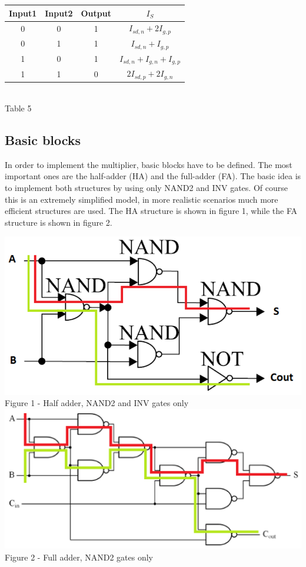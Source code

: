 \documentclass[11pt]{article} %
\begin{document}
\begin{center}
\begin{tabular}{|c|c|c|c|}
	\hline 
            Input1 & Input2 & Output & $I_{S}$\\
	\hline          
	0 & 0 & 1 & $I_{sd,n} + 2I_{g,p}$\\
	\hline 
	0 & 1 & 1 & $I_{sd,n} + I_{g,p}$\\ 
	\hline 
	1 & 0 & 1 & $I_{sd,n} + I_{g,n} + I_{g,p}$\\ 
	\hline 
	1 & 1 & 0 & $2I_{sd,p} + 2I_{g,n}$\\ 
	\hline 
\end{tabular} \\
\small{Table 5}
\end{center}
\vspace{1em}
\subsection{Basic blocks}
In order to implement the multiplier, basic blocks have to be defined. The most important ones are the half-adder (HA) and the full-adder (FA). The basic idea is to implement both structures by using only NAND2 and INV gates. Of course this is an extremely simplified model, in more realistic scenarios much more efficient structures are used. The HA structure is shown in figure 1, while the FA structure is shown in figure 2.\\
\begin{center}
\includegraphics[scale=.36]{HA.PNG}\\
\small{Figure 1 - Half adder, NAND2 and INV gates only}\\
\includegraphics[scale=.34]{FA.PNG}\\
\small{Figure 2 - Full adder, NAND2 gates only}\\
\end{center}
\end{document}
